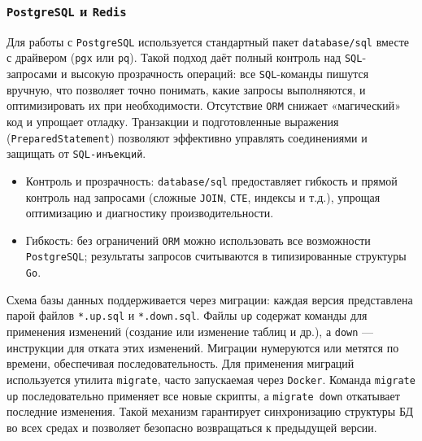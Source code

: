 \subsubsection*{\texttt{PostgreSQL} и \texttt{Redis}}
Для работы с \texttt{PostgreSQL} используется стандартный пакет \texttt{database/sql} вместе с драйвером (\texttt{pgx} или \texttt{pq}). Такой подход даёт полный контроль над \texttt{SQL}-запросами и высокую прозрачность операций: все \texttt{SQL}-команды пишутся вручную, что позволяет точно понимать, какие запросы выполняются, и оптимизировать их при необходимости. Отсутствие \texttt{ORM} снижает «магический» код и упрощает отладку. Транзакции и подготовленные выражения (\texttt{PreparedStatement}) позволяют эффективно управлять соединениями и защищать от \texttt{SQL-инъекций}.
\begin{itemize}
    \item Контроль и прозрачность: \texttt{database/sql} предоставляет гибкость и прямой контроль над запросами (сложные \texttt{JOIN}, \texttt{CTE}, индексы и т.д.), упрощая оптимизацию и диагностику производительности.
    \item Гибкость: без ограничений \texttt{ORM} можно использовать все возможности \texttt{PostgreSQL}; результаты запросов считываются в типизированные структуры \texttt{Go}.
\end{itemize}
Схема базы данных поддерживается через миграции: каждая версия представлена парой файлов \texttt{*.up.sql} и \texttt{*.down.sql}. Файлы \texttt{up} содержат команды для применения изменений (создание или изменение таблиц и др.), а \texttt{down} — инструкции для отката этих изменений. Миграции нумеруются или метятся по времени, обеспечивая последовательность. Для применения миграций используется утилита \texttt{migrate}, часто запускаемая через \texttt{Docker}. Команда \texttt{migrate up} последовательно применяет все новые скрипты, а \texttt{migrate down} откатывает последние изменения. Такой механизм гарантирует синхронизацию структуры БД во всех средах и позволяет безопасно возвращаться к предыдущей версии.

